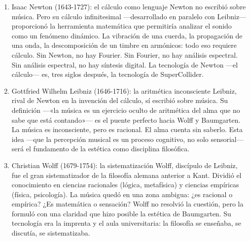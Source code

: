 \documentclass[14pt, a4paper]{article}
\begin{document}
\begin{enumerate}
paradójicamente, un avance materialista: la música no necesita
espíritu para funcionar.
\item Isaac Newton (1643-1727): el cálculo como lenguaje
\label{newton-puente}
Newton no escribió sobre música. Pero su cálculo infinitesimal
—desarrollado en paralelo con Leibniz— proporcionó la herramienta
matemática que permitiría analizar el sonido como un fenómeno
dinámico. La vibración de una cuerda, la propagación de una onda, la
descomposición de un timbre en armónicos: todo eso requiere cálculo.
Sin Newton, no hay Fourier. Sin Fourier, no hay análisis espectral.
Sin análisis espectral, no hay síntesis digital. La tecnología de
Newton —el cálculo— es, tres siglos después, la tecnología de
SuperCollider.
\item Gottfried Wilhelm Leibniz (1646-1716): la aritmética inconsciente
\label{leibniz-puente}
Leibniz, rival de Newton en la invención del cálculo, sí escribió
sobre música. Su definición —«la música es un ejercicio oculto de
aritmética del alma que no sabe que está contando»— es el puente
perfecto hacia Wolff y Baumgarten. La música es inconsciente, pero
es racional. El alma cuenta sin saberlo. Esta idea —que la percepción
musical es un proceso cognitivo, no solo sensorial— será el
fundamento de la estética como disciplina filosófica.
\item Christian Wolff (1679-1754): la sistematización
\label{wolff-puente}
Wolff, discípulo de Leibniz, fue el gran sistematizador de la
filosofía alemana anterior a Kant. Dividió el conocimiento en ciencias
racionales (lógica, metafísica) y ciencias empíricas (física,
psicología). La música quedó en una zona ambigua: ¿es racional o
empírica? ¿Es matemática o sensación? Wolff no resolvió la cuestión,
pero la formuló con una claridad que hizo posible la estética de
Baumgarten. Su tecnología era la imprenta y el aula universitaria: la
filosofía se enseñaba, se discutía, se sistematizaba.
\end{enumerate}
\end{document}
